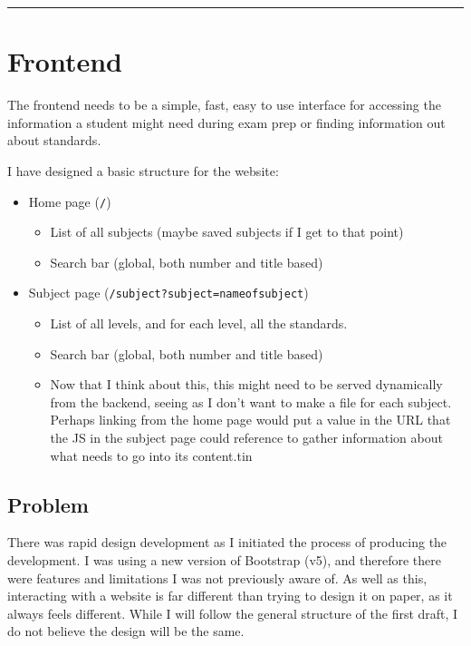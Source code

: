 \documentclass{article}
\begin{document}
\begin{center}
\rule{0.5\textwidth}{0.2pt}
\end{center}

\section{Frontend}
The frontend needs to be a simple, fast, easy to use interface for accessing the information a student might need during exam prep or finding information out about standards.

I have designed a basic structure for the website:
\begin{itemize}
    \item Home page (\texttt{/})
    \begin{itemize}
        \item List of all subjects (maybe saved subjects if I get to that point)
        \item Search bar (global, both number and title based)
    \end{itemize}
    \item Subject page (\texttt{/subject?subject=nameofsubject})
    \begin{itemize}
        \item List of all levels, and for each level, all the standards.
        \item Search bar (global, both number and title based)
        \item Now that I think about this, this might need to be served dynamically from the backend, seeing as I don't want to make a file for each subject. Perhaps linking from the home page would put a value in the URL that the JS in the subject page could reference to gather information about what needs to go into its content.tin
    \end{itemize}
\end{itemize}

\subsection*{Problem}
There was rapid design development as I initiated the process of producing the development. I was using a new version of Bootstrap (v5), and therefore there were features and limitations I was not previously aware of. As well as this, interacting with a website is far different than trying to design it on paper, as it always feels different. While I will follow the general structure of the first draft, I do not believe the design will be the same.
\end{document}
